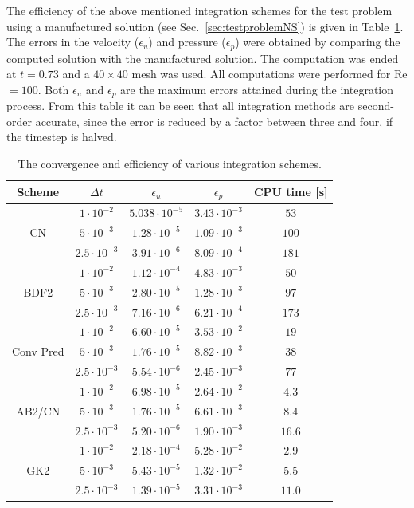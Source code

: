 The efficiency of the above mentioned integration schemes for the test problem using a manufactured solution 
(see Sec.~\ref{sec:testproblemNS}) is given in Table~\ref{tab:navstoks_integr_acc}.
The errors in the velocity ($\epsilon_u$) and pressure ($\epsilon_p$)
were obtained by comparing the computed solution with the manufactured solution.
The computation was ended at $t=0.73$ and a $40 \times 40$ mesh was used. All computations were performed for Re$=100$.
Both $\epsilon_{u}$ and  $\epsilon_{p}$ are the maximum errors attained during the integration process.
From this table it can be seen that all integration methods are second-order accurate,
since the error is reduced by a factor between three and four, if the timestep is halved.
\begin{table}[htb!]
  \caption{The convergence and efficiency of various integration schemes.}
  \label{tab:navstoks_integr_acc}
\begin{center}
  \begin{tabular}{c|cccc}
\rule{0pt}{3.5ex}  Scheme & $\Delta t$ & $\epsilon_{u}$ & $\epsilon_{p}$ & CPU time [s]\\\hline
\rule{0pt}{2.5ex}& $1\cdot 10^{-2}$ & $5.038 \cdot 10^{-5} $ & $ 3.43 \cdot 10^{-3}$ & $53$ \\
CN               & $5\cdot 10^{-3}$ & $1.28 \cdot 10^{-5} $ & $ 1.09 \cdot 10^{-3}$ & $100$ \\
                 & $2.5\cdot 10^{-3}$ & $3.91 \cdot 10^{-6} $ & $ 8.09 \cdot 10^{-4}$ & $181$ \\\hline
\rule{0pt}{2.8ex}& $1\cdot 10^{-2}$ & $1.12 \cdot 10^{-4} $ & $ 4.83 \cdot 10^{-3}$ & $50$ \\
BDF2             & $5\cdot 10^{-3}$ & $2.80 \cdot 10^{-5} $ & $ 1.28 \cdot 10^{-3}$ & $97$ \\
                 & $2.5\cdot 10^{-3}$ & $7.16 \cdot 10^{-6} $ & $ 6.21 \cdot 10^{-4}$ & $173$ \\\hline
\rule{0pt}{2.5ex}& $1\cdot 10^{-2}$ & $6.60 \cdot 10^{-5} $ & $ 3.53 \cdot 10^{-2}$ & $19$ \\
Conv Pred        & $5\cdot 10^{-3}$ & $1.76 \cdot 10^{-5} $ & $ 8.82 \cdot 10^{-3}$ & $38$ \\
                 & $2.5\cdot 10^{-3}$ & $5.54 \cdot 10^{-6} $ & $ 2.45 \cdot 10^{-3}$ & $77$\\\hline
\rule{0pt}{2.5ex}& $1\cdot 10^{-2}$ & $6.98 \cdot 10^{-5} $ & $ 2.64 \cdot 10^{-2}$ & $4.3$ \\
AB2/CN           & $5\cdot 10^{-3}$ & $1.76 \cdot 10^{-5} $ & $ 6.61 \cdot 10^{-3}$ & $8.4$ \\
                 & $2.5\cdot 10^{-3}$ & $5.20 \cdot 10^{-6} $ & $ 1.90 \cdot 10^{-3}$ & $16.6$\\\hline
\rule{0pt}{2.5ex}& $1\cdot 10^{-2}$ & $2.18 \cdot 10^{-4} $ & $ 5.28 \cdot 10^{-2}$ & $2.9$ \\
GK2              & $5\cdot 10^{-3}$ & $5.43 \cdot 10^{-5} $ & $ 1.32 \cdot 10^{-2}$ & $5.5$ \\
                 & $2.5\cdot 10^{-3}$ & $1.39 \cdot 10^{-5} $ & $ 3.31 \cdot 10^{-3}$ & $11.0$
  \end{tabular}
   

\end{center}
\end{table}
